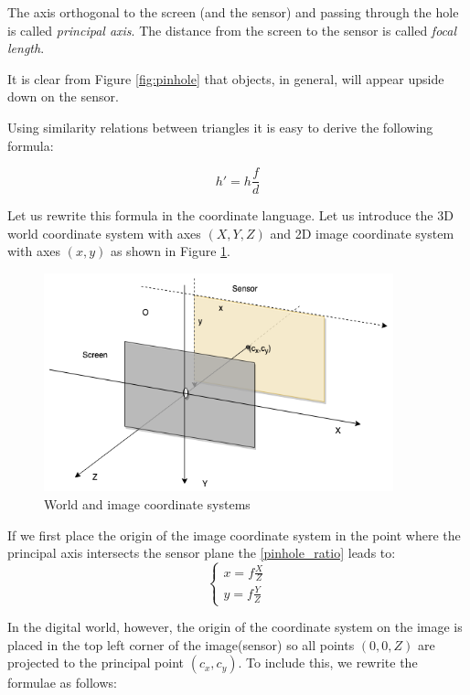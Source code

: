 \documentclass[a4paper,10pt]{article}
\begin{document}
The axis orthogonal to the screen (and the sensor) and passing through the hole is called {\it principal axis}. The distance from the screen to the sensor is called {\it focal length}. 

It is clear from Figure \ref{fig:pinhole} that objects, in general, will appear upside down on the sensor. 

Using similarity relations between triangles it is easy to derive the following formula:

\begin{equation}                                                                                                                                                                         
h' = h\frac{f}{d}
\label{pinhole_ratio}
\end{equation}

Let us rewrite this formula in the coordinate language. Let us introduce  the 3D world coordinate system  with axes $(X,Y,Z)$ and 2D image coordinate system with axes $(x,y)$ as shown in Figure \ref{fig:pinhole_coordinates}.

\begin{figure}[h]
\centering
 \includegraphics[width=0.9\textwidth]{../../images/pinhole_coords.png}
 \caption{World and image coordinate systems}
 \label{fig:pinhole_coordinates}
\end{figure}

If we first place the origin of the image coordinate system in the point where the principal axis intersects the sensor plane the \eqref{pinhole_ratio} leads to:
$$
\left\{\begin{array}{c}
x = f \frac{X}{Z} \\
y = f \frac{Y}{Z} 
\end{array}\right.
$$

In the digital world, however, the origin of the coordinate system on the image is placed in the top left corner of the image(sensor) so all points $(0,0,Z)$ are projected to the principal point $(c_x, c_y)$.  To include this, we rewrite the formulae as follows:  
\end{document}
